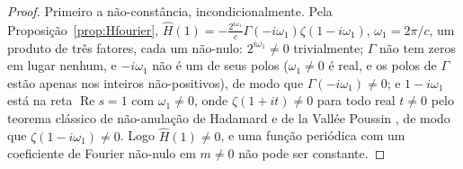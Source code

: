\documentclass[11pt]{amsart}
\theoremstyle{plain}
\theoremstyle{definition}
\theoremstyle{remark}
\begin{document}
\begin{proof}
Primeiro a não-constância, incondicionalmente. Pela Proposição~\ref{prop:Hfourier},
$\hat H(1) = -\frac{2^{i\omega_1}}{c}\Gamma(-i\omega_1)\zeta(1-i\omega_1)$, $\omega_1 = 2\pi/c$, um
produto de três fatores, cada um não-nulo: $2^{i\omega_1}\ne0$ trivialmente; $\Gamma$ não tem zeros
em lugar nenhum, e $-i\omega_1$ não é um de seus polos ($\omega_1\ne0$ é real, e os polos de
$\Gamma$ estão apenas nos inteiros não-positivos), de modo que $\Gamma(-i\omega_1)\ne0$; e
$1-i\omega_1$ está na reta $\operatorname{Re}s=1$ com $\omega_1\ne0$, onde $\zeta(1+it)\ne0$ para
todo real $t\ne0$ pelo teorema clássico de não-anulação de Hadamard e de la Vall\'ee Poussin
\cite{titchmarsh1986}, de modo que $\zeta(1-i\omega_1)\ne0$. Logo $\hat H(1)\ne0$, e uma função
periódica com um coeficiente de Fourier não-nulo em $m\ne0$ não pode ser constante.


\end{proof}
\end{document}
